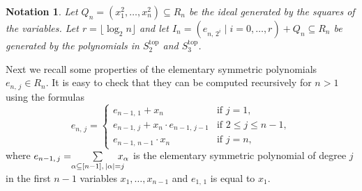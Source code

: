 \documentclass[11pt]{article}
\newcommand{\es}[2]{e_{#1,\, #2}}
\theoremstyle{plain}
\newtheorem{notat}{Notation}[section]
\theoremstyle{definition}
\theoremstyle{remark}
\begin{document}
\begin{notat}
    Let $Q_n=(x_1^2,\dots,x_n^2)\subseteq R_n$ be the ideal generated by the squares of the variables. Let $r=\lfloor\operatorname{log}_2n\rfloor$ and let $I_n=(\es{n}{2^i}\mid i=0,\dots,r)+Q_n\subseteq R_n$ be generated by the polynomials in $S_2^{\operatorname{top}}$ and $S_3^{\operatorname{top}}$. 
\end{notat}

Next we recall some properties of the elementary symmetric polynomials $\es{n}{j}\in R_n$. It is easy to check that they can be computed recursively for $n>1$ using the formulas
\begin{equation}\label{eq:enj_recursion}
    \es{n}{j} =
    \begin{cases}
        \es{n-1}{1} + x_n & \text{if } j = 1, \\
        \es{n-1}{j} + x_n\cdot\es{n-1}{j-1} & \text{if } 2\leq j\leq n-1, \\
        \es{n-1}{n-1}\cdot x_n & \text{if } j = n,
    \end{cases}
\end{equation}
where $\es{n-1}{j}=\hspace{-0.1cm}\sum\limits_{\alpha\subseteq[n-1],\,|\alpha|=j}\hspace{-0.3cm}x_\alpha$ is the elementary symmetric polynomial of degree $j$ in the first $n-1$ variables $x_1,\dots,x_{n-1}$ and $\es{1}{1}$ is equal to $x_1$. %
\end{document}
